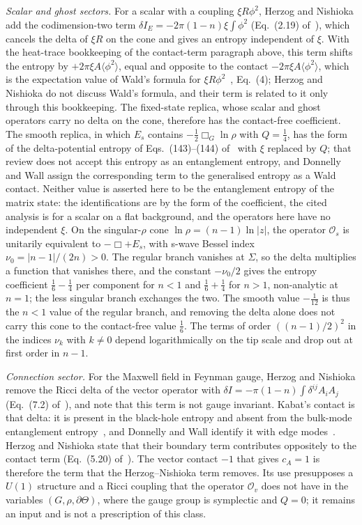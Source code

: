 \emph{Scalar and ghost sectors.} For a scalar with a coupling \(\xi R\phi^2\), Herzog and Nishioka add the codimension-two term \(\delta I_E=-2\pi(1-n)\xi\int\phi^2\) (Eq.~(2.19) of~\cite{HerzogNishioka2016}), which cancels the delta of \(\xi R\) on the cone and gives an entropy independent of \(\xi\). With the heat-trace bookkeeping of the contact-term paragraph above, this term shifts the entropy by \(+2\pi\xi A\langle\phi^2\rangle\), equal and opposite to the contact \(-2\pi\xi A\langle\phi^2\rangle\), which is the expectation value of Wald's formula for \(\xi R\phi^2\)~\cite{DonnellyWall2016}, Eq.~(4); Herzog and Nishioka do not discuss Wald's formula, and their term is related to it only through this bookkeeping. The fixed-state replica, whose scalar and ghost operators carry no delta on the cone, therefore has the contact-free coefficient. The smooth replica, in which \(E_s\) contains \(-\tfrac12\Box_G\ln\rho\) with \(Q=\tfrac14\), has the form of the delta-potential entropy of Eqs.~(143)--(144) of~\cite{Solodukhin2011} with \(\xi\) replaced by \(Q\); that review does not accept this entropy as an entanglement entropy, and Donnelly and Wall assign the corresponding term to the generalised entropy as a Wald contact. Neither value is asserted here to be the entanglement entropy of the matrix state: the identifications are by the form of the coefficient, the cited analysis is for a scalar on a flat background, and the operators here have no independent \(\xi\). On the singular-\(\rho\) cone \(\ln\rho=(n-1)\ln|z|\), the operator \(\mathcal O_s\) is unitarily equivalent to \(-\Box+E_s\), with s-wave Bessel index \(\nu_0=|n-1|/(2n)>0\). The regular branch vanishes at \(\Sigma\), so the delta multiplies a function that vanishes there, and the constant \(-\nu_0/2\) gives the entropy coefficient \(\tfrac16-\tfrac14\) per component for \(n<1\) and \(\tfrac16+\tfrac14\) for \(n>1\), non-analytic at \(n=1\); the less singular branch exchanges the two. The smooth value \(-\tfrac1{12}\) is thus the \(n<1\) value of the regular branch, and removing the delta alone does not carry this cone to the contact-free value \(\tfrac16\). The terms of order \(((n-1)/2)^2\) in the indices \(\nu_k\) with \(k\neq0\) depend logarithmically on the tip scale and drop out at first order in \(n-1\).

\emph{Connection sector.} For the Maxwell field in Feynman gauge, Herzog and Nishioka remove the Ricci delta of the vector operator with \(\delta I=-\pi(1-n)\int\delta^{ij}A_iA_j\) (Eq.~(7.2) of~\cite{HerzogNishioka2016}), and note that this term is not gauge invariant. Kabat's contact is that delta: it is present in the black-hole entropy and absent from the bulk-mode entanglement entropy~\cite{Kabat1995}, and Donnelly and Wall identify it with edge modes~\cite{DonnellyWall2016}. Herzog and Nishioka state that their boundary term contributes oppositely to the contact term (Eq.~(5.20) of~\cite{HerzogNishioka2016}). The vector contact \(-1\) that gives \(c_A=1\) is therefore the term that the Herzog--Nishioka term removes. Its use presupposes a \(U(1)\) structure and a Ricci coupling that the operator \(\mathcal O_v\) does not have in the variables \((G,\rho,\partial\Theta)\), where the gauge group is symplectic and \(Q=0\); it remains an input and is not a prescription of this class.

